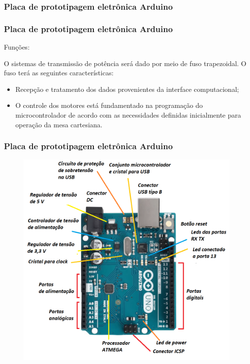 \subsubsection{Placa de prototipagem eletrônica Arduino}

\begin{frame}
\frametitle{Placa de prototipagem eletrônica Arduino}

Funções:

O sistemas de transmissão de potência será dado por meio de fuso trapezoidal. 
O fuso terá as seguintes características:

\begin{itemize}
    \item Recepção e tratamento dos dados provenientes da interface computacional;
    \item O controle dos motores está fundamentado na programação do microcontrolador de acordo com as necessidades definidas inicialmente para operação da mesa cartesiana.
\end{itemize}

\end{frame}
    
\begin{frame}
\frametitle{Placa de prototipagem eletrônica Arduino}

\begin{figure}
\centering
\includegraphics[scale = 0.3]{figs/placaarduino}
\end{figure}

\end{frame}
